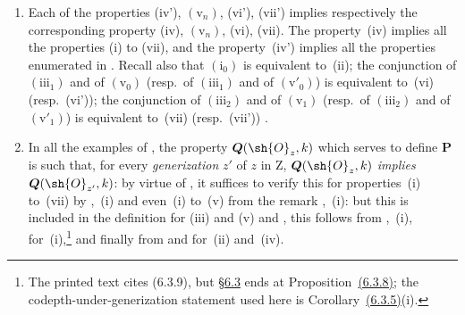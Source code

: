 \begin{remarks}[7.3.9]
\label{IV.7.3.9}
\begin{enumerate}[label=\emph{\roman*)}]
  \item Each of the properties (iv'), $(\mathrm{v}_n)$, (vi'), (vii') implies respectively the corresponding property (iv), $(\mathrm{v}_n)$, (vi), (vii).
  The property~(iv) implies all the properties (i) to (vii), and the property~(iv') implies all the properties enumerated in .
  Recall also that $(\mathrm{i}_0)$ is equivalent to~(ii); the conjunction of $(\mathrm{iii}_1)$ and of $(\mathrm{v}_0)$ (resp.~of $(\mathrm{iii}_1)$ and of $(\mathrm{v}'_0)$) is equivalent to~(vi) (resp.~(vi')); the conjunction of $(\mathrm{iii}_2)$ and of $(\mathrm{v}_1)$ (resp.~of $(\mathrm{iii}_2)$ and of $(\mathrm{v}'_1)$) is equivalent to~(vii) (resp.~(vii')) .

  \item In all the examples of , the property $\boldsymbol{Q}(\sh{O}_z,k)$ which serves to define $\boldsymbol{P}$ is such that, for every \emph{generization} $z'$ of $z$ in $\mathrm{Z}$, $\boldsymbol{Q}(\sh{O}_z,k)$ \emph{implies} $\boldsymbol{Q}(\sh{O}_{z'},k)$: by virtue of , it suffices to verify this for properties~(i) to~(vii) by ,~(i) and even~(i) to~(v) from the remark ,~(i): but this is included in the definition for (iii) and (v)  and , this follows from ,~(i), for~(i),\footnote{The printed text cites (6.3.9), but {\hyperlink{ega4.c04.subsec.6-3}{\S6.3}} ends at Proposition~{\hyperlink{ega4.c04.prop.6-3-8}{(6.3.8)}}; the codepth-under-generization statement used here is Corollary~{\hyperlink{ega4.c04.cor.6-3-5}{(6.3.5)}}(i).} and finally from  and  for~(ii) and~(iv).
\end{enumerate}
\end{remarks}

